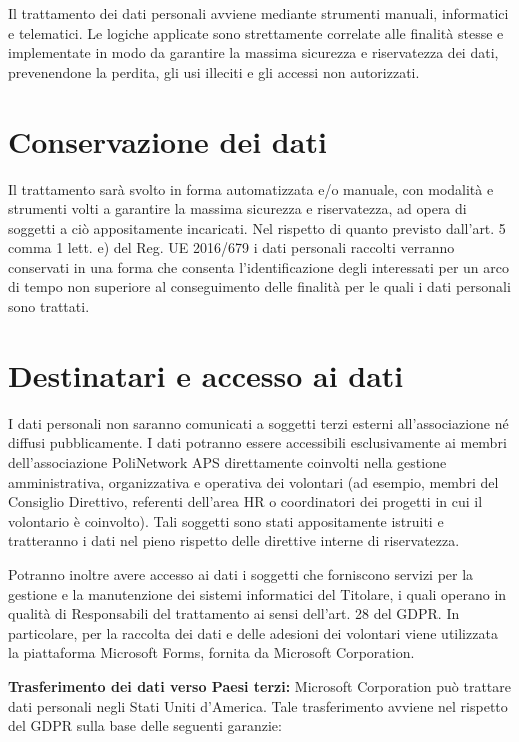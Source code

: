 \documentclass[legal]{polinetwork}
\begin{document}
Il trattamento dei dati personali avviene mediante strumenti manuali, informatici e telematici. Le logiche applicate sono strettamente correlate alle finalità stesse e implementate in modo da garantire la massima sicurezza e riservatezza dei dati, prevenendone la perdita, gli usi illeciti e gli accessi non autorizzati.

\section{Conservazione dei dati}

Il trattamento sarà svolto in forma automatizzata e/o manuale, con modalità e strumenti volti a garantire la massima sicurezza e riservatezza, ad opera di soggetti a ciò appositamente incaricati. Nel rispetto di quanto previsto dall’art. 5 comma 1 lett. e) del Reg. UE 2016/679 i dati personali raccolti verranno conservati in una forma che consenta l’identificazione degli interessati per un arco di tempo non superiore al conseguimento delle finalità per le quali i dati personali sono trattati.

\section{Destinatari e accesso ai dati}

I dati personali non saranno comunicati a soggetti terzi esterni all’associazione né diffusi pubblicamente. I dati potranno essere accessibili esclusivamente ai membri dell’associazione PoliNetwork APS direttamente coinvolti nella gestione amministrativa, organizzativa e operativa dei volontari (ad esempio, membri del Consiglio Direttivo, referenti dell'area HR o coordinatori dei progetti in cui il volontario è coinvolto). Tali soggetti sono stati appositamente istruiti e tratteranno i dati nel pieno rispetto delle direttive interne di riservatezza.

Potranno inoltre avere accesso ai dati i soggetti che forniscono servizi per la gestione e la manutenzione dei sistemi informatici del Titolare, i quali operano in qualità di Responsabili del trattamento ai sensi dell’art. 28 del GDPR. In particolare, per la raccolta dei dati e delle adesioni dei volontari viene utilizzata la piattaforma Microsoft Forms, fornita da Microsoft Corporation.

\textbf{Trasferimento dei dati verso Paesi terzi:} Microsoft Corporation può trattare dati personali negli Stati Uniti d’America. Tale trasferimento avviene nel rispetto del GDPR sulla base delle seguenti garanzie:
\end{document}
